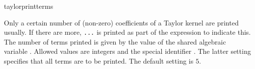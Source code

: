 \begin{Variable}{taylorprintterms}

    Only a certain number of (non-zero) coefficients of a Taylor
    kernel are printed usually. If there are more, \verb|...| is
    printed as part of the expression to indicate this. The number of
    terms printed is given by the value of the shared algebraic
    variable .  Allowed values are integers
    and the special identifier . The latter setting
    specifies that all terms are to be printed. The default setting is
    $5$.

\end{Variable}

